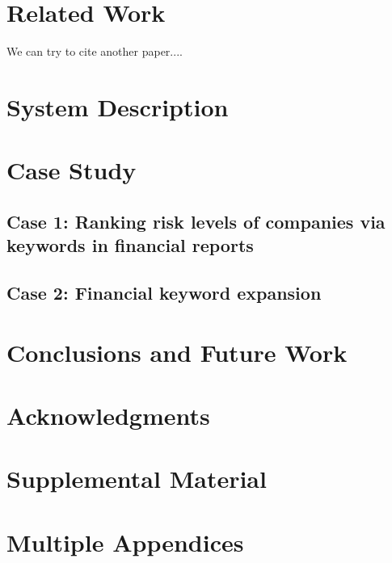 \documentclass[11pt]{article}
\begin{document}
\section{Related Work}
We can try to cite another paper....



\section{System Description}


\section{Case Study}
\subsection{Case 1: Ranking risk levels of companies via keywords in financial reports}
\subsection{Case 2: Financial keyword expansion}
\section{Conclusions and Future Work}

\section*{Acknowledgments}





\appendix
\section{Supplemental Material} \label{sec:supplemental}
\section{Multiple Appendices}
\end{document}

